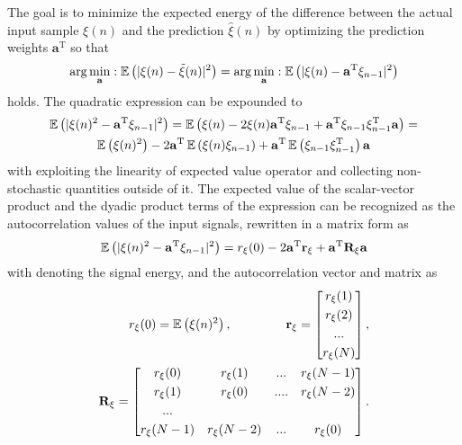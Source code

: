 The goal is to minimize the expected energy of the difference between the actual input sample $\xi(n)$ and the prediction $\hat{\xi}(n)$ by optimizing the prediction weights $\mathbf{a}^{\mathrm{T}}$ so that 
\begin{equation}
\arg\min\limits_{\mathbf{a}}: \operatorname{\mathbb{E}}\left( | \xi(n) - \tilde{\xi}(n) |^2 \right) = \arg\min\limits_{\mathbf{a}}: \operatorname{\mathbb{E}}\left( | \xi(n) - \mathbf{a}^{\mathrm{T}} \mathbf{\xi}_{n-1} |^2 \right) 
\end{equation}
holds.
The quadratic expression can be expounded to
\begin{multline}
\operatorname{\mathbb{E}}\left( | \xi(n)^2 - \mathbf{a}^{\mathrm{T}} \mathbf{\xi}_{n-1} |^2 \right) =
\operatorname{\mathbb{E}}\left( \xi(n) - 2\xi(n)\mathbf{a}^{\mathrm{T}} \mathbf{\xi}_{n-1}  + \mathbf{a}^{\mathrm{T}} \mathbf{\xi}_{n-1}  \mathbf{\xi}_{n-1}^{\mathrm{T}} \mathbf{a}\right) = \\
\operatorname{\mathbb{E}}\left( \xi(n)^2 \right) - 2 \mathbf{a}^{\mathrm{T}} \operatorname{\mathbb{E}}\left(  \xi(n) \mathbf{\xi}_{n-1} \right) + \mathbf{a}^{\mathrm{T}} \operatorname{\mathbb{E}}\left(  \mathbf{\xi}_{n-1}  \mathbf{\xi}_{n-1}^{\mathrm{T}} \right) \mathbf{a}
\end{multline}
with exploiting the linearity of expected value operator and collecting non-stochastic quantities outside of it.
The expected value of the scalar-vector product and the dyadic product terms of the expression can be recognized as the autocorrelation values of the input signals, rewritten in a matrix form as
\begin{equation}
\operatorname{\mathbb{E}}\left( | \xi(n)^2 - \mathbf{a}^{\mathrm{T}} \mathbf{\xi}_{n-1} |^2 \right) =
r_{\xi}(0) - 2 \mathbf{a}^{\mathrm{T}} \mathbf{r}_{\xi} + \mathbf{a}^{\mathrm{T}} \mathbf{R}_\xi \mathbf{a}
\label{Eq:quad_eq}
\end{equation}
with denoting the signal energy, and the autocorrelation vector and matrix as
\begin{align}
\begin{split}
r_{\xi}(0) = \EX\left( \xi(n)^2 \right), \hspace{15mm}
\mathbf{r}_{\xi} =  \begin{bmatrix}
       r_\xi(1) \\[0.3em]
       r_\xi(2) \\[0.3em]
       ... \\[0.3em]
       r_\xi(N) \end{bmatrix}, \\
\mathbf{R}_{\xi} =  \begin{bmatrix}
       r_\xi(0) & r_\xi(1) & ... & r_\xi(N-1) \\[0.3em]
       r_\xi(1) & r_\xi(0) & .... & r_\xi(N-2)\\[0.3em]
       ... \\[0.3em]
       r_\xi(N-1) & r_\xi(N-2) & ... & r_\xi(0)\end{bmatrix}.
\end{split}
\end{align}
